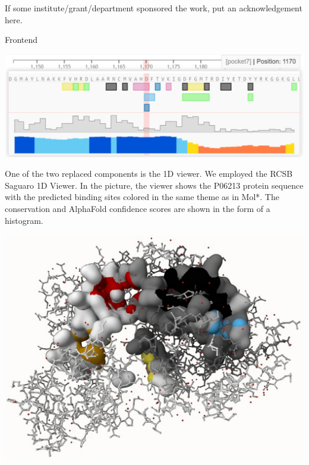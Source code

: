 \documentclass[portrait,a0paper,fontscale=0.25]{baposter}
\begin{document}
\begin{poster}
%
%

\begin{posterbox}[column=0, span=2, name=footer, below=tech,
	textborder=none, headerborder=none, boxheaderheight=0pt,
	boxColorOne=black!3]{}
If some institute/grant/department sponsored the work, put an acknowledgement here.
\end{posterbox}

%
%
%

\begin{posterbox}[column=1, name=result1]{Frontend}
\begin{center}
	\includegraphics[width=0.8\linewidth]{img/1D.pdf}
\end{center}

One of the two replaced components is the 1D viewer. We employed the RCSB Saguaro 1D Viewer.
In the picture, the viewer shows the P06213 protein sequence with the predicted binding sites colored in the same theme as in Mol*.
The conservation and AlphaFold confidence scores are shown in the form of a histogram.

\begin{center}
	\includegraphics[width=0.8\linewidth]{img/molstar.pdf}
\end{center}


\end{posterbox}
\end{poster}
\end{document}
